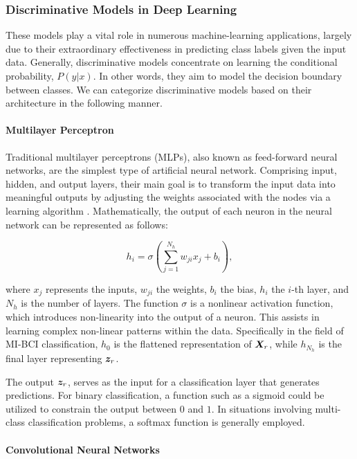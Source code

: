 \subsubsection{Discriminative Models in Deep Learning}

These models play a vital role in numerous machine-learning applications, largely due to their extraordinary effectiveness in predicting class labels given the input data. Generally, discriminative models concentrate on learning the conditional probability, $P(y|x)$. In other words, they aim to model the decision boundary between classes. We can categorize discriminative models based on their architecture in the following manner.

\paragraph{Multilayer Perceptron}

Traditional multilayer perceptrons (MLPs), also known as feed-forward neural networks, are the simplest type of artificial neural network. Comprising input, hidden, and output layers, their main goal is to transform the input data into meaningful outputs by adjusting the weights associated with the nodes via a learning algorithm . Mathematically, the output of each neuron in the neural network can be represented as follows:

\begin{equation}
h_i = \sigma \left( \sum_{j=1}^{N_h} w_{ji} x_j + b_i \right),
\end{equation}

where $x_j$ represents the inputs, $w_{ji}$ the weights, $b_i$ the bias, $h_i$ the $i$-th layer, and $N_h$ is the number of layers. The function $\sigma$ is a nonlinear activation function, which introduces non-linearity into the output of a neuron. This assists in learning complex non-linear patterns within the data. Specifically in the field of MI-BCI classification, $h_0$ is the flattened representation of $\bm {X}_r$, while $h_{N_h}$ is the final layer representing $\bm {z}_r$.

The output $\bm {z}_r$, serves as the input for a classification layer that generates predictions. For binary classification, a function such as a sigmoid could be utilized to constrain the output between $0$ and $1$. In situations involving multi-class classification problems, a softmax function is generally employed.

\paragraph{Convolutional Neural Networks}


